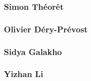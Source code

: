 \documentclass[11pt]{article}
\begin{document}
\subsubsection*{Simon Théorêt}
\subsubsection*{Olivier Déry-Prévost}
\subsubsection*{Sidya Galakho}
\subsubsection*{Yizhan Li}

 


\appendix
\end{document}
